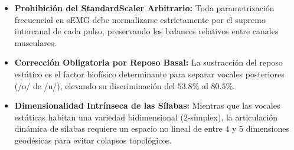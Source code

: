 \begin{itemize}
    \item \textbf{Prohibición del StandardScaler Arbitrario:} Toda parametrización frecuencial en sEMG debe normalizarse estrictamente por el supremo intercanal de cada pulso, preservando los balances relativos entre canales musculares.
    \item \textbf{Corrección Obligatoria por Reposo Basal:} La sustracción del reposo estático es el factor biofísico determinante para separar vocales posteriores (/o/ de /u/), elevando su discriminación del $53.8\%$ al $80.5\%$.
    \item \textbf{Dimensionalidad Intrínseca de las Sílabas:} Mientras que las vocales estáticas habitan una variedad bidimensional ($2$-símplex), la articulación dinámica de sílabas requiere un espacio no lineal de entre $4$ y $5$ dimensiones geodésicas para evitar colapsos topológicos.
\end{itemize}
